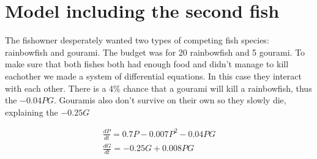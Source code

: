 

\section{Model including the second fish}

\begin{flushleft}
    The fishowner desperately wanted two types of competing fish species:
    rainbowfish and gourami. The budget was for 20 rainbowfish and 5 gourami.
    To make sure that both fishes both had enough food and didn't manage to kill eachother
    we made a system of differential equations. In this case they interact with each other.
    There is a 4\% chance that a gourami will kill a rainbowfish, thus the $-0.04PG$.
    Gouramis also don't survive on their own so they slowly die, explaining the $-0.25G$
\end{flushleft}

\begin{align*}[left = \empheqlbrace]
    \frac{dP}{dt}= 0.7P-0.007P^2-0.04PG \\
    \frac{dG}{dt} = -0.25G+0.008PG
\end{align*}

